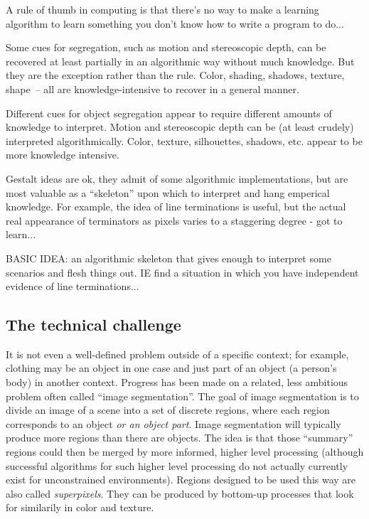 A rule of thumb in computing is that there's no way to make a learning
algorithm to learn something you don't know how to write a program to do...


Some cues for segregation, such as motion and stereoscopic depth, can
be recovered at least partially in an algorithmic way without much
knowledge.  But they are the exception rather than the rule.  Color,
shading, shadows, texture, shape~-- all are knowledge-intensive to
recover in a general manner.

Different cues for object segregation appear to require different 
amounts of knowledge to interpret.  Motion and stereoscopic depth
can be (at least crudely) interpreted algorithmically.
Color, texture, silhouettes, shadows, etc. appear to be more
knowledge intensive.

Gestalt ideas are ok, they admit of some algorithmic implementations,
but are most valuable as a ``skeleton'' upon which to interpret and hang
emperical knowledge.  For example, the idea of line terminations is
useful, but the actual real appearance of terminators as pixels varies
to a staggering degree - got to learn...

BASIC IDEA: an algorithmic skeleton that gives enough to 
interpret some scenarios and flesh things out.  IE find a situation in
which you have independent evidence of line terminations...



\subsection{The technical challenge}


%
It is not even a well-defined problem outside of a specific
context; for example, clothing may be an object in
one case and just part of an object (a person's body) in another context.
%
%
Progress has been made on a related, less ambitious problem
often called ``image segmentation''.  The goal of image segmentation
is to divide an image of a scene into a set of discrete
regions, where each region corresponds to an object {\em or 
an object part}.  
%
%
Image segmentation will typically produce more regions than there are
objects.  The idea is that those ``summary'' regions could then be
merged by more informed, higher level processing (although successful
algorithms for such higher level processing do not actually currently
exist for unconstrained environments).  Regions designed to be
used this way are also called {\em superpixels}.
%
They can be produced by bottom-up processes that look for 
similarily in color and texture.  


